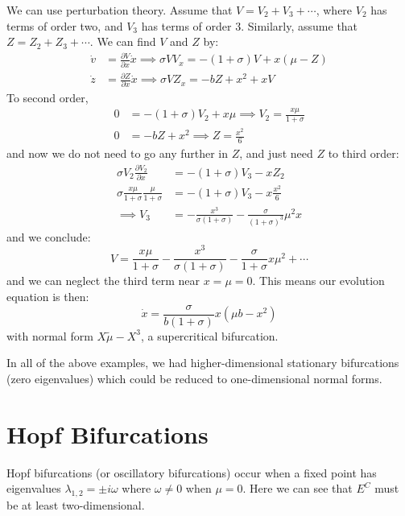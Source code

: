 \documentclass[../Main.tex]{subfiles}
\begin{document}
\begin{example}
    We can use perturbation theory. Assume that $V = V_2 + V_3 + \cdots$, where $V_2$ has terms of order two, and $V_3$ has terms of order 3. Similarly, assume that $Z = Z_2 + Z_3 + \cdots$. We can find $V$ and $Z$ by:
    \begin{align*}
        \dot{v} &= \frac{\partial V}{\partial x} \dot x \implies \sigma V V_x = -(1+\sigma) V + x(\mu - Z) \\
        \dot z &= \frac{\partial Z}{\partial x} \dot x \implies \sigma V Z_x = -bZ + x^2 + xV
    \end{align*}
    To second order,
    \begin{align*}
        0 &= -(1+\sigma) V_2 + x\mu \implies V_2 = \frac{x\mu}{1+\sigma} \\
        0 &= -bZ + x^2 \implies Z = \frac{x^2}{6}
    \end{align*}
    and now we do not need to go any further in $Z$, and just need $Z$ to third order:
    \begin{align*}
        \sigma V_2 \frac{\partial V_2}{\partial x} &= -(1+\sigma) V_3 - xZ_2 \\
        \sigma \frac{x\mu}{1+\sigma} \frac{\mu}{1+\sigma} &= -(1+\sigma) V_3 - x \frac{x^2}{6} \\
        \implies V_3 &= -\frac{x^3}{\sigma(1+\sigma)} - \frac{\sigma}{(1+\sigma)^3} \mu^2 x
    \end{align*}
    and we conclude:
    \begin{equation*}
        V = \frac{x\mu}{1+\sigma} - \frac{x^3}{\sigma(1+\sigma)} - \frac{\sigma}{1+\sigma} x\mu^2 + \cdots
    \end{equation*}
    and we can neglect the third term near $x = \mu = 0$. This means our evolution equation is then:
    \begin{equation*}
        \dot x = \frac{\sigma}{b(1+\sigma)} x(\mu b - x^2)
    \end{equation*}
    with normal form $X\tilde\mu - X^3$, a supercritical bifurcation.
\end{example}
\begin{remark}
    In all of the above examples, we had higher-dimensional stationary bifurcations (zero eigenvalues) which could be reduced to one-dimensional normal forms.
\end{remark}
\section{Hopf Bifurcations}
Hopf bifurcations (or oscillatory bifurcations) occur when a fixed point has eigenvalues $\lambda_{1, 2} = \pm i \omega$ where $\omega \neq 0$ when $\mu = 0$. Here we can see that $E^C$ must be at least two-dimensional.
\end{document}
